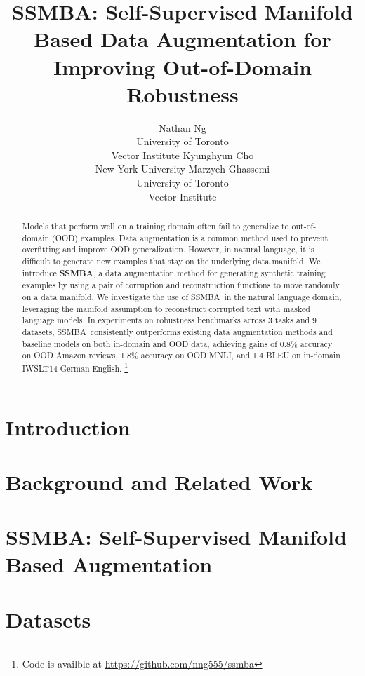 \documentclass[11pt,a4paper]{article}
\title{SSMBA: Self-Supervised Manifold Based Data Augmentation for Improving Out-of-Domain Robustness}
\author{Nathan Ng\\
  University of Toronto \\
  Vector Institute
  \And
  Kyunghyun Cho \\
  New York University
  \And
  Marzyeh Ghassemi \\
  University of Toronto \\
  Vector Institute\\ 
  }
\date{}
\def\ssmba{SSMBA}
\begin{document}
\maketitle
\begin{abstract}
  Models that perform well on a training domain often fail to generalize to out-of-domain (OOD) examples.
  Data augmentation is a common method used to prevent overfitting and improve OOD generalization.
  However, in natural language, it is difficult to generate new examples that stay on the underlying data manifold.
  We introduce \textbf{\ssmba}, a data augmentation method for generating synthetic training examples by using a pair of corruption and reconstruction functions to move randomly on a data manifold.
  We investigate the use of \ssmba\ in the natural language domain, leveraging the manifold assumption to reconstruct corrupted text with masked language models. %
  In experiments on robustness benchmarks across 3 tasks and 9 datasets, \ssmba\ consistently outperforms existing data augmentation methods and baseline models on both in-domain and OOD data, achieving gains of 0.8\% accuracy on OOD Amazon reviews, 1.8\% accuracy on OOD MNLI, and 1.4 BLEU on in-domain IWSLT14 German-English. 
  \footnote{Code is availble at \url{https://github.com/nng555/ssmba}}
\end{abstract}

\section{Introduction}
\label{sec:intro}


\section{Background and Related Work}
\label{sec:background}


\section{SSMBA: Self-Supervised Manifold Based Augmentation}
\label{sec:ssmba}


\section{Datasets}
\label{sec:data}

\end{document}
